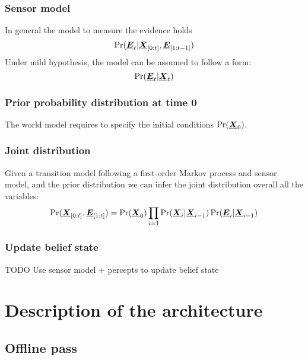 \documentclass[11pt, reqno]{amsart}
\theoremstyle{definition}
\theoremstyle{remark}
\begin{document}
  \subsubsection{Sensor model}
  In general the model to measure the evidence holds
  $$
  \Pr(\boldsymbol{\underline{E}}_t | \boldsymbol{\underline{X}}_{[0:t]}, \boldsymbol{\underline{E}}_{[1:t-1]})
  $$
  Under mild hypothesis, the model can be assumed to follow a form:
  $$
  \Pr(\boldsymbol{\underline{E}}_t | \boldsymbol{\underline{X}}_t)
  $$

  \subsubsection{Prior probability distribution at time 0}
  The world model requires to specify the initial conditions $\Pr(\boldsymbol{\underline{X}}_0)$.

  \subsubsection{Joint distribution}
  Given a transition model following a first-order Markov process and sensor
  model, and the prior distribution we can infer the joint distribution overall
  all the variables:
  $$
  \Pr(\boldsymbol{\underline{X}}_{[0:t]}, \boldsymbol{\underline{E}}_{[1:t]}) = \Pr(\boldsymbol{\underline{X}}_0) \prod_{i=1} \Pr(\boldsymbol{\underline{X}}_i | \boldsymbol{\underline{X}}_{i-1}) \Pr(\boldsymbol{\underline{E}}_i | \boldsymbol{\underline{X}}_{i-1})
  $$

  \subsubsection{Update belief state}
  TODO
  Use sensor model + percepts to update belief state


  \section{Description of the architecture}

  \subsection{Offline pass}
\end{document}
